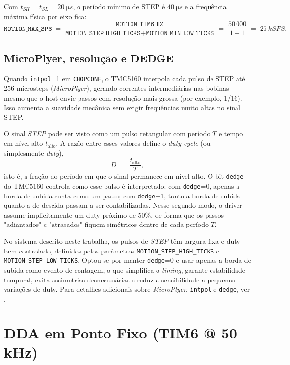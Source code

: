 \noindent
Com $t_{SH}=t_{SL}=\SI{20}{\micro s}$, o per\'iodo m\'inimo de STEP \'e $\SI{40}{\micro s}$ e a frequ\^encia m\'axima f\'isica por eixo fica:
\[
\texttt{MOTION\_MAX\_SPS} \;=\; 
\frac{\texttt{MOTION\_TIM6\_HZ}}{\texttt{MOTION\_STEP\_HIGH\_TICKS}+\texttt{MOTION\_MIN\_LOW\_TICKS}}
\;=\; \frac{50\,000}{1+1} \;=\; \SI{25}{kSPS}.
\]

\subsection{MicroPlyer, resolu\c{c}\~ao e DEDGE}
Quando \texttt{intpol}=1 em \texttt{CHOPCONF}, o TMC5160 interpola cada pulso de STEP at\'e 256 microsteps (\emph{MicroPlyer}), gerando correntes intermedi\'arias nas bobinas mesmo que o host envie passos com resolu\c{c}\~ao mais grossa (por exemplo, 1/16). Isso aumenta a suavidade mec\^anica sem exigir frequ\^encias muito altas no sinal STEP.

O sinal \emph{STEP} pode ser visto como um pulso retangular com per\'iodo
$T$ e tempo em n\'ivel alto $t_{\text{alto}}$. A raz\~ao entre esses valores
define o \emph{duty cycle} (ou simplesmente \emph{duty}),
\[
  D \;=\; \frac{t_{\text{alto}}}{T},
\]
isto \'e, a fra\c{c}\~ao do per\'iodo em que o sinal permanece em n\'ivel alto.
O bit \texttt{dedge} do TMC5160 controla como esse pulso \'e interpretado:
com \texttt{dedge}=0, apenas a borda de subida conta como um passo; com
\texttt{dedge}=1, tanto a borda de subida quanto a de descida passam a ser
contabilizadas. Nesse segundo modo, o driver assume implicitamente um duty
pr\'oximo de 50\%, de forma que os passos "adiantados" e "atrasados" fiquem
sim\'etricos dentro de cada per\'iodo $T$.

No sistema descrito neste trabalho, os pulsos de \emph{STEP} t\^em largura
fixa e duty bem controlado, definidos pelos par\^ametros
\texttt{MOTION\_STEP\_HIGH\_TICKS} e \texttt{MOTION\_STEP\_LOW\_TICKS}. Optou-se
por manter \texttt{dedge}=0 e usar apenas a borda de subida como evento de
contagem, o que simplifica o \emph{timing}, garante estabilidade temporal,
evita assimetrias desnecess\'arias e reduz a sensibilidade a pequenas
varia\c{c}\~oes de duty. Para detalhes adicionais sobre \emph{MicroPlyer},
\texttt{intpol} e \texttt{dedge}, ver \cite{tmc5160_ds}.

\FloatBarrier
\section{DDA em Ponto Fixo (TIM6 @ 50\,kHz)}
\label{sec:dda}


